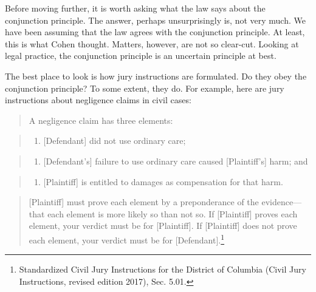 \documentclass[
  10pt,
  dvipsnames,enabledeprecatedfontcommands]{scrartcl}
\providecommand{\tightlist}{%
  \setlength{\itemsep}{0pt}\setlength{\parskip}{0pt}}
\begin{document}
Before moving further, it is worth asking what the law says about the
conjunction principle. The answer, perhaps unsurprisingly is, not very
much. We have been assuming that the law agrees with the conjunction
principle. At least, this is what Cohen thought. Matters, however, are
not so clear-cut. Looking at legal practice, the conjunction principle
is an uncertain principle at best.

The best place to look is how jury instructions are formulated. Do they
obey the conjunction principle? To some extent, they do. For example,
here are jury instructions about negligence claims in civil cases:

\begin{quote}
A negligence claim has three elements:
\end{quote}

\begin{quote}
\begin{enumerate}
\def\labelenumi{\arabic{enumi}.}
\tightlist
\item
  {[}Defendant{]} did not use ordinary care;
\end{enumerate}
\end{quote}

\begin{quote}
\begin{enumerate}
\def\labelenumi{\arabic{enumi}.}
\setcounter{enumi}{1}
\tightlist
\item
  {[}Defendant's{]} failure to use ordinary care caused
  {[}Plaintiff's{]} harm; and
\end{enumerate}
\end{quote}

\begin{quote}
\begin{enumerate}
\def\labelenumi{\arabic{enumi}.}
\setcounter{enumi}{2}
\tightlist
\item
  {[}Plaintiff{]} is entitled to damages as compensation for that harm.
\end{enumerate}
\end{quote}

\begin{quote}
{[}Plaintiff{]} must prove each element by a preponderance of the
evidence---that each element is more likely so than not so. If
{[}Plaintiff{]} proves each element, your verdict must be for
{[}Plaintiff{]}. If {[}Plaintiff{]} does not prove each element, your
verdict must be for {[}Defendant{]}.\footnote{Standardized Civil Jury
  Instructions for the District of Columbia (Civil Jury Instructions,
  revised edition 2017), Sec. 5.01.}
\end{quote}
\end{document}
